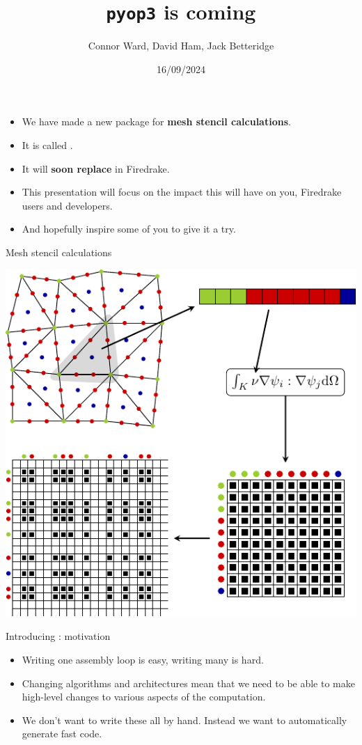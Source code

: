 \documentclass[aspectratio=169]{beamer}
\title{\texttt{pyop3} is coming}
\author{Connor Ward, David Ham, Jack Betteridge}
\date{16/09/2024}
\begin{document}
\frame{\titlepage}

\begin{frame}
  \begin{itemize}
    \item
      We have made a new package for \textbf{mesh stencil calculations}.
    \item
      It is called .
    \item
      It will \textbf{soon replace } in Firedrake.
    \item
      This presentation will focus on the impact this will have on you, Firedrake users and developers.
    \item
      And hopefully inspire some of you to give it a try.
  \end{itemize}
\end{frame}

\begin{frame}{Mesh stencil calculations}
  \vspace{-2em}
  \begin{center}
    \includegraphics[scale=.9]{fem_assembly.pdf}
  \end{center}
\end{frame}

\begin{frame}{Introducing : motivation}
  \begin{itemize}
    \item 
      Writing one assembly loop is easy, writing many is hard.
    \item
      Changing algorithms and architectures mean that we need to be able to make high-level changes to various aspects of the computation.
    \item
      We don't want to write these all by hand. Instead we want to automatically generate fast code.
  \end{itemize}
\end{frame}
\end{document}
